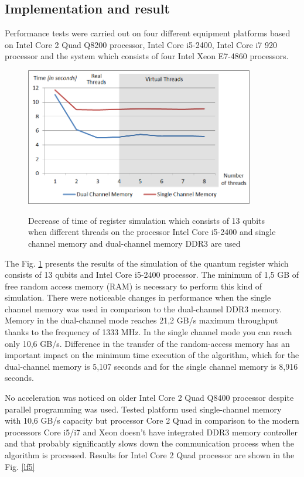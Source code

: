 \documentclass[10pt, a5paper]{article}
\begin{document}
\subsection*{Implementation and result}

Performance tests were carried out on four different equipment platforms based on Intel Core 2 Quad Q8200 processor, Intel Core i5-2400, Intel Core i7 920 processor and the system which consists of four Intel Xeon E7-4860 processors.

\begin{figure}
  \centering
  \includegraphics[width=10cm]{18_2012_2b.png}
  \label{lf2}
  \caption{Decrease of time of register simulation which consists of 13 qubits when different threads on the processor Intel Core i5-2400 and single channel memory and dual-channel memory DDR3 are used}
\end{figure}

The Fig. \ref{lf2} presents the results of the simulation of the quantum register which consists of 13 qubits and Intel Core i5-2400 processor. The minimum of 1,5 GB of free random access memory (RAM) is necessary to perform this kind of simulation. There were noticeable changes in performance when the single channel memory was used in comparison to the dual-channel DDR3 memory. Memory in the dual-channel mode reaches 21,2 GB/s maximum throughput thanks to the frequency of 1333 MHz. In the single channel mode you can reach only 10,6 GB/s. Difference in the transfer of the random-access memory has an important impact on the minimum time execution of the algorithm, which for the dual-channel memory is 5,107 seconds and for the single channel memory is 8,916 seconds.

No acceleration was noticed on older Intel Core 2 Quad Q8400 processor despite  parallel programming was used. Tested platform used single-channel memory with 10,6 GB/s capacity  but processor Core 2 Quad in comparison to the modern processors Core i5/i7 and Xeon doesn't have integrated DDR3 memory controller and that probably significantly slows down the communication process when the algorithm is processed. Results for Intel Core 2 Quad processor are shown in the Fig. \ref{lf5}
\end{document}
